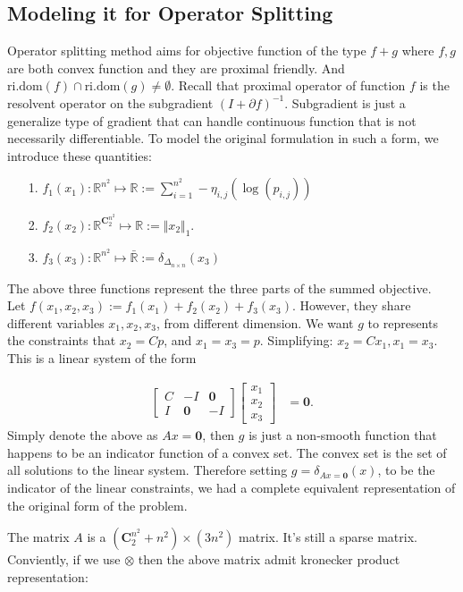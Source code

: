 \documentclass[11pt]{article}
\theoremstyle{definition}
\numberwithin{equation}{subsection}
\begin{document}
    \subsection{Modeling it for Operator Splitting}
        Operator splitting method aims for objective function of the type $f + g$ where $f, g$ are both convex function and they are proximal friendly. 
        And $\text{ri.dom}(f)\cap \text{ri.dom}(g) \neq \emptyset$. 
        Recall that proximal operator of function $f$ is the resolvent operator on the subgradient $(I + \partial f)^{-1}$. 
        Subgradient is just a generalize type of gradient that can handle continuous function that is not necessarily differentiable. 
        To model the original formulation in such a form, we introduce these quantities: 
        \begin{itemize}
            \item [1.] $f_1(x_1): \mathbb R^{n^2}\mapsto \mathbb R := \sum_{i = 1}^{n^2}-\eta_{i, j}(\log(p_{i, j}))$
            \item [2.] $f_2(x_2): \mathbb R^{\mathbf C^{n^2}_2}\mapsto \mathbb R := \Vert x_2\Vert_1$. 
            \item [3.] $f_3(x_3): \mathbb R^{n^2}\mapsto \mathbb {\bar R}:= \delta_{\Delta_{n\times n}}(x_3)$
        \end{itemize}
        \begin{linenumbers}
            The above three functions represent the three parts of the summed objective. 
            \\
            Let $f(x_1, x_2, x_3):= f_1(x_1) + f_2(x_2) + f_3(x_3)$. 
            However, they share different variables $x_1, x_2, x_3$, from different dimension. 
            We want $g$ to represents the constraints that $x_2 = Cp$, and $x_1 = x_3 = p$. 
            Simplifying: $x_2 = C x_1, x_1 = x_3$. 
            This is a linear system of the form    
        \end{linenumbers}
        \begin{align*}
            \begin{bmatrix}
                C & -I & \mathbf 0
                \\
                I & \mathbf 0 & -I
            \end{bmatrix}
            \begin{bmatrix}
                x_1 \\ x_2 \\ x_3
            \end{bmatrix}
            &= \mathbf 0. 
        \end{align*}
        Simply denote the above as $A x = \mathbf 0$, then $g$ is just a non-smooth function that happens to be an indicator function of a convex set. 
        The convex set is the set of all solutions to the linear system. 
        Therefore setting $g = \delta_{Ax = \mathbf 0}(x)$, to be the indicator of the linear constraints, we had a complete equivalent representation of the original form of the problem. 
        \par
        The matrix $A$ is a $(\mathbf C^{n^2}_2 + n^2) \times (3n^2)$ matrix. 
        It's still a sparse matrix. 
        Conviently, if we use $\otimes$ then the above matrix admit kronecker product representation: 
\end{document}
